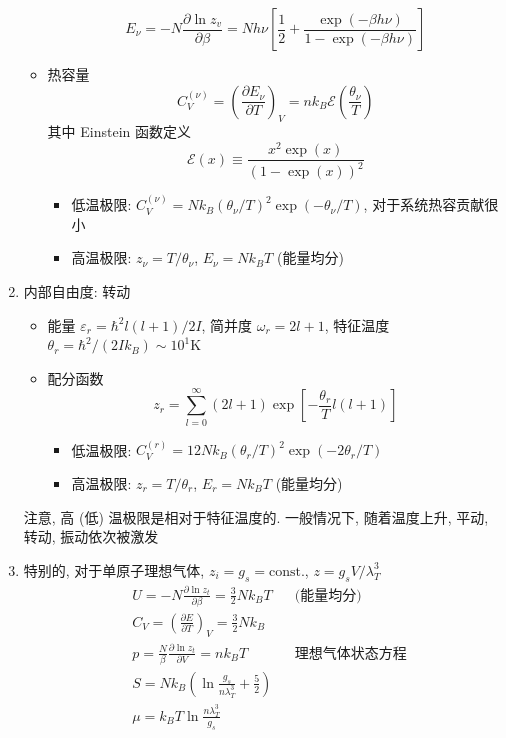 \documentclass[12pt,a4paper]{article}%
\numberwithin{equation}{section}
\begin{document}
\begin{enumerate}
\begin{itemize}
        \begin{equation}
            E_\nu =-N \frac{\partial\ln z_v}{\partial\beta} 
            = Nh\nu\left[\frac 12 + \frac{\exp(-\beta h\nu)}{1-\exp(-\beta h\nu)}\right]
        \end{equation}
        \item 热容量
        \begin{equation}
            C_V^{(\nu)} = \left(\frac{\partial E_\nu}{\partial T}\right)_V 
            = nk_B\mathcal E\left(\frac{\theta_\nu}T\right)
        \end{equation}
        其中 Einstein 函数定义
        \begin{equation}\label{equ:einstein_func}
            \mathcal E(x) \equiv \frac{x^2\exp(x)}{(1-\exp(x))^2}
        \end{equation}
        \begin{itemize}
            \item 低温极限: $C_V^{(\nu)}= Nk_B(\theta_\nu/T)^2\exp(-\theta_\nu/T)$, 对于系统热容贡献很小
            \item 高温极限: $z_\nu = T/\theta_\nu$, $E_\nu = Nk_B T$ (能量均分)
        \end{itemize}
    \end{itemize}
    \item 内部自由度: 转动
    \begin{itemize}
        \item 能量 $\varepsilon_r = \hbar^2 l(l+1)/2I$, 
        简并度 $\omega_r = 2l+1$, 
        特征温度 $\theta_r = \hbar^2/(2Ik_B)\sim 10^1\mathrm K$
        \item 配分函数
        \begin{equation}
            z_r = \sum_{l=0}^\infty (2l+1)\exp\left[-\frac{\theta_r}T l(l+1)\right]
        \end{equation}
        \begin{itemize}
            \item 低温极限: $C_V^{(r)} = 12Nk_B(\theta_r/T)^2\exp\left(-2\theta_r/T\right)$
            \item 高温极限: $z_r = T/\theta_r$, $E_r = Nk_B T$ (能量均分)
        \end{itemize}
    \end{itemize}
    注意, 高 (低) 温极限是相对于特征温度的. 一般情况下, 随着温度上升, 平动, 转动, 振动依次被激发
    \item 特别的, 对于单原子理想气体, $z_i = g_s = \mbox{const.}$, $z = g_sV/\lambda_T^3$
        \begin{align}
            &U = -N \frac{\partial \ln z_t}{\partial \beta} 
            = \frac 32 Nk_B  T &&\mbox{(能量均分)} \\
            &C_V = \left(\frac{\partial E}{\partial T}\right)_V 
            = \frac 32 Nk_B \\
            &p = \frac N\beta \frac{\partial\ln z_t}{\partial V}
            =nk_BT &&\mbox{理想气体状态方程} \\
            &S =  Nk_B\left(\ln\frac{g_s}{n\lambda_T^3} + \frac 52\right)\\
            &\mu = k_BT\ln\frac{n\lambda_T^3}{g_s}
        \end{align}
\end{enumerate}
\end{document}
